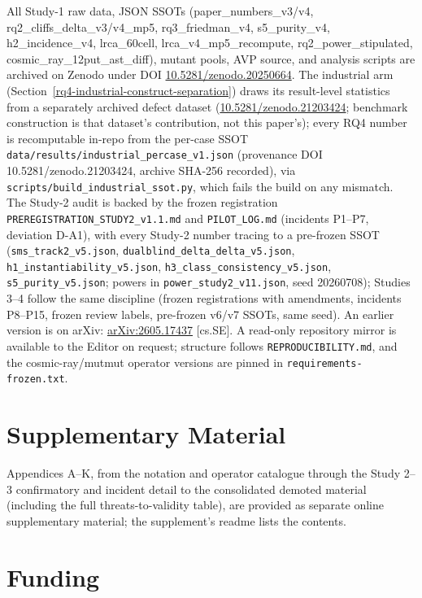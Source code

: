 \documentclass[manuscript,screen,review]{acmart}
\begin{document}
All Study-1 raw data, JSON SSOTs (paper\_numbers\_v3/v4,
rq2\_cliffs\_delta\_v3/v4\_mp5, rq3\_friedman\_v4, s5\_purity\_v4,
h2\_incidence\_v4, lrca\_60cell, lrca\_v4\_mp5\_recompute,
rq2\_power\_stipulated, cosmic\_ray\_12put\_ast\_diff), mutant pools, AVP source,
and analysis scripts are archived on Zenodo under DOI
\href{https://doi.org/10.5281/zenodo.20250664}{10.5281/zenodo.20250664}. The
industrial arm (Section~\ref{rq4-industrial-construct-separation}) draws its
result-level statistics from a separately archived defect dataset
\citep{defect4mr2026}
(\href{https://doi.org/10.5281/zenodo.21203424}{10.5281/zenodo.21203424};
benchmark construction is that dataset's contribution, not this paper's); every
RQ4 number is recomputable in-repo from the per-case SSOT
\texttt{data/results/industrial\_percase\_v1.json} (provenance DOI
10.5281/zenodo.21203424, archive SHA-256 recorded), via
\texttt{scripts/build\_industrial\_ssot.py}, which fails the build on any
mismatch. The Study-2 audit is backed by the frozen registration
\texttt{PREREGISTRATION\_STUDY2\_v1.1.md} and \texttt{PILOT\_LOG.md} (incidents
P1--P7, deviation D-A1), with every Study-2 number tracing to a pre-frozen SSOT
(\texttt{sms\_track2\_v5.json}, \texttt{dualblind\_delta\_delta\_v5.json},
\texttt{h1\_instantiability\_v5.json}, \texttt{h3\_class\_consistency\_v5.json},
\texttt{s5\_purity\_v5.json}; powers in \texttt{power\_study2\_v11.json}, seed
20260708); Studies 3--4 follow the same discipline (frozen registrations
with amendments, incidents P8--P15, frozen review labels, pre-frozen v6/v7
SSOTs, same seed). An earlier version is on arXiv:
\href{https://arxiv.org/abs/2605.17437}{arXiv:2605.17437} [cs.SE]. A read-only
repository mirror is available to the Editor on request; structure follows
\texttt{REPRODUCIBILITY.md}, and the cosmic-ray/mutmut operator versions are
pinned in \texttt{requirements-frozen.txt}.



\section*{Supplementary Material}

Appendices A--K, from the notation and operator catalogue through the Study
2--3 confirmatory and incident detail to the consolidated demoted material
(including the full threats-to-validity table), are provided as separate
online supplementary material; the supplement's readme lists the contents.

\section*{Funding}
\end{document}
